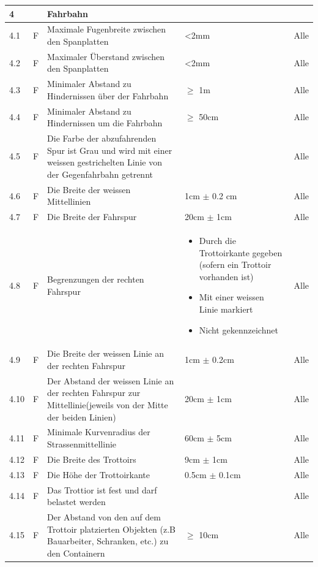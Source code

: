 \begin{center}
\begin{tabular}{|p{1cm}|p{0.5cm}|p{5cm}|p{5cm}|p{1.5cm}|}\hline
 \textbf{4} & & \textbf{Fahrbahn} & & \\\hline
 4.1 & F & Maximale Fugenbreite zwischen den Spanplatten & <2mm & Alle\\\hline
 4.2 & F & Maximaler Überstand zwischen den Spanplatten & <2mm & Alle\\ \hline
 4.3 & F & Minimaler Abstand zu Hindernissen über der Fahrbahn &  $\geq$ 1m & Alle\\\hline
 4.4 & F & Minimaler Abstand zu Hindernissen um die Fahrbahn &  $\geq$ 50cm & Alle\\\hline
 4.5 & F & Die Farbe der abzufahrenden Spur ist Grau und wird mit einer weissen gestrichelten Linie von der Gegenfahrbahn getrennt &   & Alle\\ \hline
 4.6 & F & Die Breite der weissen Mittellinien & 1cm $\pm$ 0.2 cm & Alle\\ \hline
 4.7 & F & Die Breite der Fahrspur &  20cm $\pm$ 1cm & Alle\\ \hline
 4.8 & F & Begrenzungen der rechten Fahrspur & \begin{itemize} \item Durch die Trottoirkante gegeben (sofern ein Trottoir vorhanden ist)\item Mit einer weissen Linie markiert \item Nicht gekennzeichnet \end{itemize}  & Alle\\ \hline
 4.9 & F & Die Breite der weissen Linie an der rechten Fahrspur &  1cm $\pm$ 0.2cm & Alle\\ \hline
 4.10 & F & Der Abstand der weissen Linie an der rechten Fahrspur zur Mittellinie(jeweils von der Mitte der beiden Linien)&  20cm $\pm$ 1cm & Alle\\ \hline
 4.11 & F & Minimale Kurvenradius der Strassenmittellinie &  60cm $\pm$ 5cm & Alle\\ \hline
 4.12 & F & Die Breite des Trottoirs &  9cm $\pm$ 1cm & Alle\\ \hline
 4.13 & F & Die Höhe der Trottoirkante &  0.5cm $\pm$ 0.1cm & Alle\\ \hline
 4.14 & F & Das Trottior ist fest und darf belastet werden & & Alle\\ \hline
 4.15 & F & Der Abstand von den auf dem Trottoir platzierten Objekten (z.B Bauarbeiter, Schranken, etc.) zu den Containern & $\geq$ 10cm & Alle\\ \hline

\end{tabular}
\end{center}
